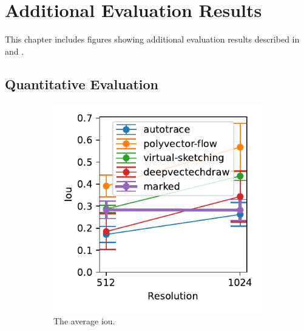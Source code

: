 \clearpage
\appendix
\chapter{Additional Evaluation Results}

This chapter includes figures showing additional evaluation results described in  and .

\clearpage
\section{Quantitative Evaluation}

\begin{figure}[!h]
    \centering
    \begin{subfigure}{.3\textwidth}
    \centering
    \includegraphics[width=\textwidth]{graphics/eval/iou_1024-1.024_True_tonari.pdf}
    \caption{The average \gls{iou}.}
\end{subfigure}
    \begin{subfigure}{.3\textwidth}
    \centering

\end{subfigure}
\end{figure}
